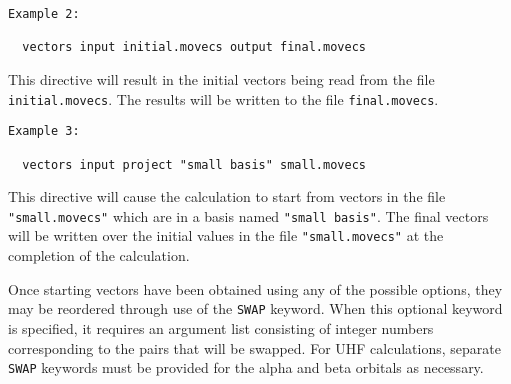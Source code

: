 \begin{verbatim}
Example 2:

  vectors input initial.movecs output final.movecs
\end{verbatim}

This directive will result in the initial vectors being read from the file
\verb+initial.movecs+.  The results will be written to the file
\verb+final.movecs+.

\begin{verbatim}
Example 3:

  vectors input project "small basis" small.movecs
\end{verbatim}

This directive will cause the calculation to start from vectors in the
file \verb+"small.movecs"+ which are in a basis named \verb+"small basis"+.
The final vectors will be written over the initial values in the file
\verb+"small.movecs"+ at the completion of the calculation.
 

Once starting vectors have been obtained using any of the possible
options, they may be reordered through use of the \verb+SWAP+ keyword.
When this optional keyword is specified, it requires an
argument list consisting of integer numbers corresponding to the pairs 
that will be swapped.
For UHF calculations, separate \verb+SWAP+ keywords must be provided
for the alpha and beta orbitals as necessary.

%
%
% 
% 
% 
%
% 

